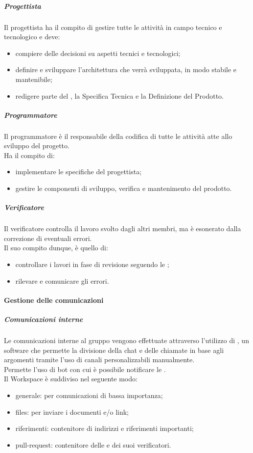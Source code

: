     		\subparagraph{Progettista}
    		Il progettista ha il compito di gestire tutte le attività in campo tecnico e tecnologico e deve:
    		\begin{itemize}
    			\item compiere delle decisioni su aspetti tecnici e tecnologici;
    			\item definire e sviluppare l'architettura che verrà sviluppata, in modo stabile e mantenibile;
    			\item redigere parte del , la Specifica Tecnica e la Definizione del Prodotto.
    		\end{itemize}

    		\subparagraph{Programmatore}
    		Il programmatore è il responsabile della codifica di tutte le attività atte allo sviluppo del progetto. \\
    		Ha il compito di:
    		\begin{itemize}
    			\item implementare le specifiche del progettista;
    			\item gestire le componenti di sviluppo, verifica e mantenimento del prodotto.
    		\end{itemize}

    		\subparagraph{Verificatore}
    		Il verificatore controlla il lavoro svolto dagli altri membri, ma è esonerato dalla correzione di eventuali errori. \\
    		Il suo compito dunque, è quello di:

    		\begin{itemize}
    			\item controllare i lavori in fase di revisione seguendo le ;
    			\item rilevare e comunicare gli errori.
    		\end{itemize}

		\paragraph{Gestione delle comunicazioni}
    		\subparagraph{Comunicazioni interne}
    		Le comunicazioni interne al gruppo vengono effettuate attraverso l'utilizzo di , un software che permette la divisione della chat e delle chiamate in base agli argomenti tramite l'uso di canali personalizzabili manualmente. \\ Permette l'uso di bot con cui è possibile notificare le .\\
    		Il Workspace è suddiviso nel seguente modo:
    		\begin{itemize}
    		 	\item {\ttfamily generale}: per comunicazioni di bassa importanza;
    		 	\item {\ttfamily files}: per inviare i documenti e/o link;
    		 	\item {\ttfamily riferimenti}: contenitore di indirizzi e riferimenti importanti;
    		    \item {\ttfamily pull-request}: contenitore delle  e dei suoi verificatori.
    		\end{itemize}


